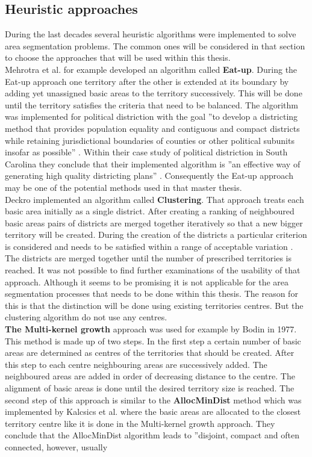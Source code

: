 \subsection{Heuristic approaches}
During the last decades several heuristic algorithms were implemented to solve area segmentation problems. The common ones will be considered in that section to choose the approaches that will be used within this thesis. \\
Mehrotra et al. \cite{mehrotra} for example developed an algorithm called \textbf{Eat-up}. During the Eat-up approach one territory after the other is extended at its boundary by adding yet unassigned basic areas to the territory successively. This will be done until the territory satisfies the criteria that need to be balanced. The algorithm was implemented for political distriction with the goal ''to develop a districting method that provides population equality and contiguous and compact districts while retaining jurisdictional boundaries of counties or other political subunits insofar as possible'' \cite{mehrotra}. Within their case study of political distriction in South Carolina they conclude that their implemented algorithm is ''an effective way of generating high quality districting plans'' \cite{mehrotra}. Consequently the Eat-up approach may be one of the potential methods used in that master thesis.\\
Deckro \cite{deckro} implemented an algorithm called \textbf{Clustering}. That approach treats each basic area initially as a single district. After creating a ranking of neighboured basic areas pairs of districts are merged together iteratively so that a new bigger territory will be created. During the creation of the districts a particular criterion is considered and needs to be satisfied within a range of acceptable variation \cite{deckro}. The districts are merged together until the number of prescribed territories is reached. It was not possible to find further examinations of the usability of that approach. Although it seems to be promising it is not applicable for the area segmentation processes that needs to be done within this thesis. The reason for this is that the distinction will be done using existing territories centres. But the clustering algorithm do not use any centres. \\
\textbf{The Multi-kernel growth} approach was used for example by Bodin \cite{bodin} in 1977. This method is made up of two steps. In the first step a certain number of basic areas are determined as centres of the territories that should be created. After this step to each centre neighbouring areas are successively added. The neighboured areas are added in order of decreasing distance to the centre. The alignment of basic areas is done until the desired territory size is reached. The second step of this approach is similar to the \textbf{AllocMinDist} method which was implemented by Kalcsics et al. \cite{kalcsics2} where the basic areas are allocated to the closest territory centre like it is done in the Multi-kernel growth approach. They conclude that the AllocMinDist algorithm leads to ''disjoint, compact and often connected, however, usually
